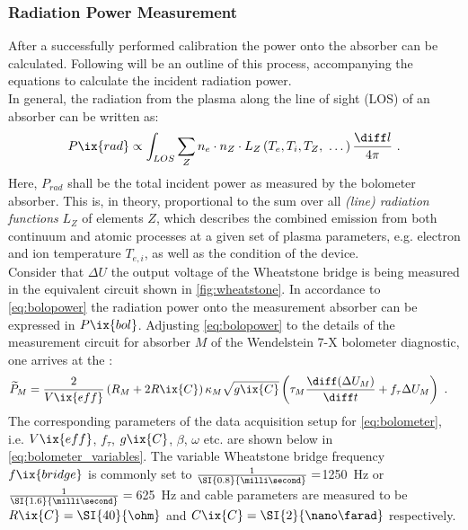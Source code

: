             \subsubsection*{Radiation Power Measurement}%
%
                After a successfully performed calibration the power onto the absorber can be calculated. Following will be an outline of this process, accompanying the equations to calculate the incident radiation power.\\%
                In general, the radiation from the plasma along the line of sight (LOS) of an absorber can be written as:%
%
                \begin{align}%
                    P\ix{rad}\propto\int_{LOS}\sum_{Z}n_{e}\cdot n_{Z}\cdot L_{Z}\left(T_{e}, T_{i}, T_{Z},\,\,\dots\right)\frac{\diff l}{4\pi}\,\,.\label{eq:lineradiation}%
                \end{align}%
%
                Here, $P_{rad}$ shall be the total incident power as measured by the bolometer absorber. This is, in theory, proportional to the sum over all \textit{(line) radiation functions} $L_{Z}$ of elements $Z$, which describes the combined emission from both continuum and atomic processes at a given set of plasma parameters, e.g. electron and ion temperature $T_{e,i}$, as well as the condition of the device.\\%
                Consider that $\Delta U$ the output voltage of the Wheatstone bridge is being measured in the equivalent circuit shown in \cref{fig:wheatstone}. In accordance to \cref{eq:bolopower} the radiation power onto the measurement absorber can be expressed in $P\ix{bol}$. Adjusting \cref{eq:bolopower} to the details of the measurement circuit for absorber $M$ of the Wendelstein 7-X bolometer diagnostic, one arrives at the :%
%
                \begin{align}%
                        \widetilde{P}_{M}=\frac{2}{V\ix{eff}}&\left(R_{M}+2R\ix{C}\right)\kappa_{M}\sqrt{g\ix{C}}\left(\tau_{M}\frac{\diff(\Delta U_{M})}{\diff t}+f_{\tau}\Delta U_{M}\right)\,\,.\label{eq:bolometer}%
                \end{align}%
%
                The corresponding parameters of the data acquisition setup for \cref{eq:bolometer}, i.e. $V\ix{eff}$, $f_{\tau}$, $g\ix{C}$, $\beta$, $\omega$ etc. are shown below in \cref{eq:bolometer_variables}. The variable Wheatstone bridge frequency $f\ix{bridge}$ is commonly set to $\frac{1}{\text{\SI{0.8}{\milli\second}}}=$\SI{1250}{\hertz} or $\frac{1}{\text{\SI{1.6}{\milli\second}}}=\,$\SI{625}{\hertz} and cable parameters are measured to be $R\ix{C}=\text{\SI{40}{\ohm}}$ and $C\ix{C}=\text{\SI{2}{\nano\farad}}$ respectively.%
